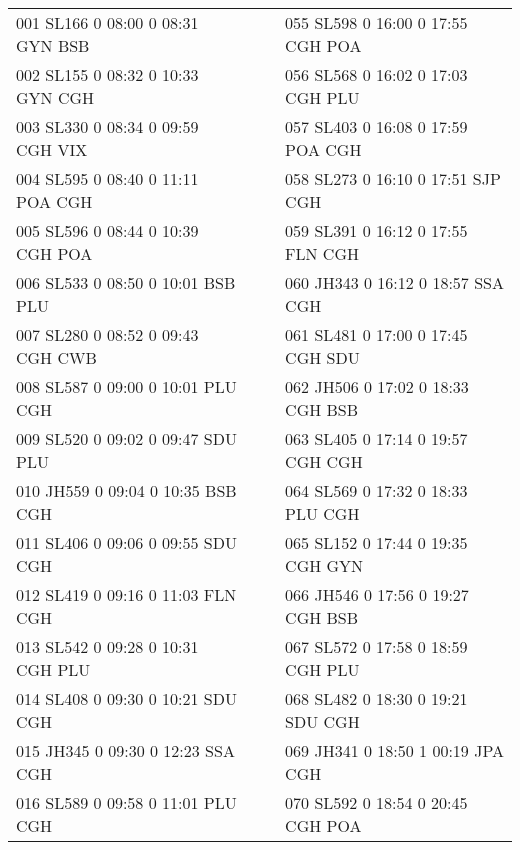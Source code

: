 \begin{scriptsize}

\begin{longtable}{l c c l}
001 SL166  0 08:00 0 08:31 GYN BSB & & & 055 SL598  0 16:00 0 17:55 CGH POA \\

002 SL155  0 08:32 0 10:33 GYN CGH & & & 056 SL568  0 16:02 0 17:03 CGH PLU \\

003 SL330  0 08:34 0 09:59 CGH VIX & & & 057 SL403  0 16:08 0 17:59 POA CGH \\

004 SL595  0 08:40 0 11:11 POA CGH & & & 058 SL273  0 16:10 0 17:51 SJP CGH \\

005 SL596  0 08:44 0 10:39 CGH POA & & & 059 SL391  0 16:12 0 17:55 FLN CGH \\

006 SL533  0 08:50 0 10:01 BSB PLU & & & 060 JH343  0 16:12 0 18:57 SSA CGH \\

007 SL280  0 08:52 0 09:43 CGH CWB & & & 061 SL481  0 17:00 0 17:45 CGH SDU \\

008 SL587  0 09:00 0 10:01 PLU CGH & & & 062 JH506  0 17:02 0 18:33 CGH BSB \\

009 SL520  0 09:02 0 09:47 SDU PLU & & & 063 SL405  0 17:14 0 19:57 CGH CGH \\

010 JH559  0 09:04 0 10:35 BSB CGH & & & 064 SL569  0 17:32 0 18:33 PLU CGH \\

011 SL406  0 09:06 0 09:55 SDU CGH & & & 065 SL152  0 17:44 0 19:35 CGH GYN \\

012 SL419  0 09:16 0 11:03 FLN CGH & & & 066 JH546  0 17:56 0 19:27 CGH BSB \\

013 SL542  0 09:28 0 10:31 CGH PLU & & & 067 SL572  0 17:58 0 18:59 CGH PLU \\

014 SL408  0 09:30 0 10:21 SDU CGH & & & 068 SL482  0 18:30 0 19:21 SDU CGH \\

015 JH345  0 09:30 0 12:23 SSA CGH & & & 069 JH341  0 18:50 1 00:19 JPA CGH \\

016 SL589  0 09:58 0 11:01 PLU CGH & & & 070 SL592  0 18:54 0 20:45 CGH POA \\


\end{longtable}
\end{scriptsize}
